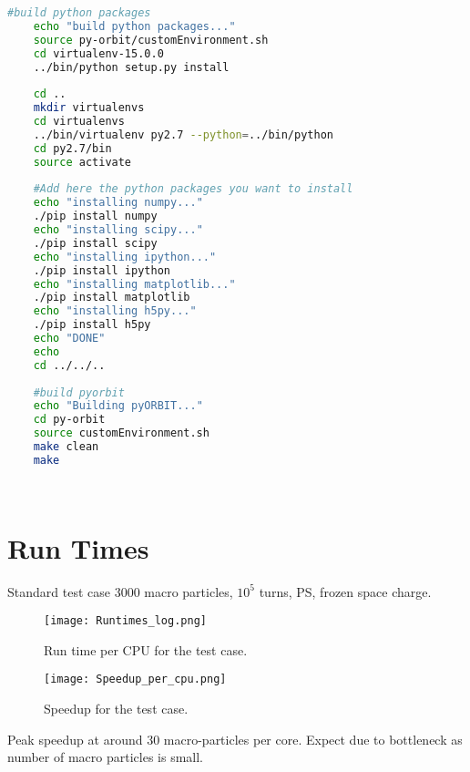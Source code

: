 \documentclass[a4paper]{cernatsnote}
\begin{document}
\begin{lstlisting}[language=bash]
	#build python packages
	echo "build python packages..."
	source py-orbit/customEnvironment.sh
	cd virtualenv-15.0.0
	../bin/python setup.py install
	
	cd ..
	mkdir virtualenvs
	cd virtualenvs
	../bin/virtualenv py2.7 --python=../bin/python
	cd py2.7/bin
	source activate
	
	#Add here the python packages you want to install
	echo "installing numpy..."
	./pip install numpy
	echo "installing scipy..."
	./pip install scipy
	echo "installing ipython..."
	./pip install ipython
	echo "installing matplotlib..."
	./pip install matplotlib
	echo "installing h5py..."
	./pip install h5py
	echo "DONE"
	echo
	cd ../../..
	
	#build pyorbit
	echo "Building pyORBIT..."
	cd py-orbit
	source customEnvironment.sh
	make clean
	make
	
	
	\end{lstlisting}
	
	\newpage

	\section{Run Times}
	Standard test case 3000 macro particles, $10^{5}$ turns, PS, frozen space charge.
	
	\begin{figure}		
		\centering
		\texttt{[image: Runtimes\_log.png]}
		\caption{Run time per CPU for the test case.}
		\label{fig:runtime}
	\end{figure}

	\begin{figure}		
		\centering
		\texttt{[image: Speedup\_per\_cpu.png]}
		\caption{Speedup for the test case.}
		\label{fig:speedup}
	\end{figure}

Peak speedup at around 30 macro-particles per core. Expect due to bottleneck as number of macro particles is small.
	
\end{document}
